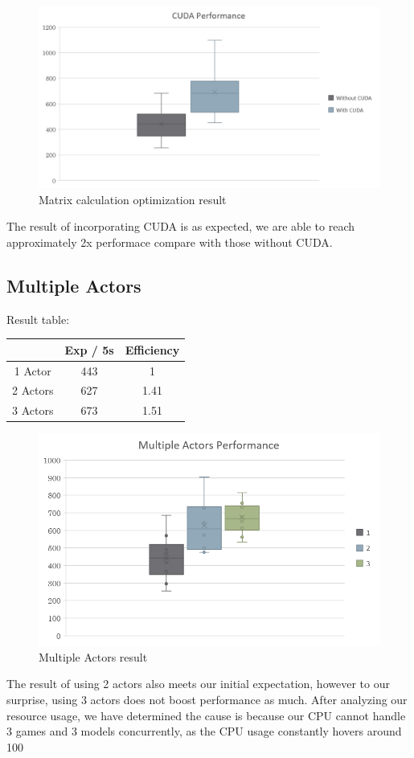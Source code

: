 \documentclass[sigconf]{acmart}
\begin{document}
\begin{figure}[H]
  \centering
  \includegraphics[width=\columnwidth]{cuda_r.png}
  \caption{Matrix calculation optimization result}
\end{figure}
The result of incorporating CUDA is as expected, we are able to reach approximately 2x performace compare with those without CUDA. 


\subsection{Multiple Actors}
Result table:
\begin{center}
  \begin{tabular}{ |c|c|c| } 
   \hline
    & Exp / 5s & Efficiency \\ 
   \hline
   1 Actor & 443 & 1 \\ 
   \hline
   2 Actors & 627 & 1.41 \\ 
   \hline
   3 Actors & 673 & 1.51 \\ 
   \hline
  \end{tabular}
\end{center}
\begin{figure}[h]
  \centering
  \includegraphics[width=\columnwidth]{actor_r.png}
  \caption{Multiple Actors result}
\end{figure}
The result of using 2 actors also meets our initial expectation, however to our surprise, using 3 actors does not boost performance as much. After analyzing our resource usage, we have determined the cause is because our CPU cannot handle 3 games and 3 models concurrently, as the CPU usage constantly hovers around 100%
\end{document}
